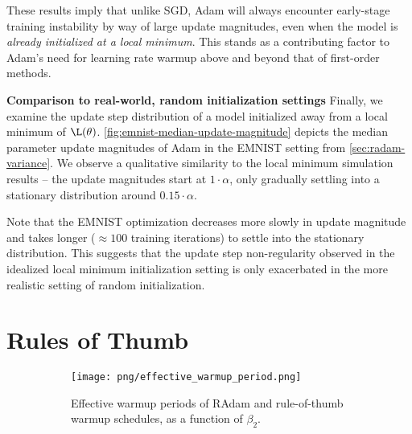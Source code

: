 {These results imply that unlike SGD, Adam will always encounter early-stage training instability by way of large update magnitudes, even when the model is \emph{already initialized at a local minimum}. This stands as a contributing factor to Adam's need for learning rate warmup above and beyond that of first-order methods.

\textbf{Comparison to real-world, random initialization settings}
\quad
Finally, we examine the update step distribution of a model initialized away from a local minimum of $\L(\theta)$. \cref*{fig:emnist-median-update-magnitude} depicts the median parameter update magnitudes of Adam in the EMNIST setting from \cref*{sec:radam-variance}. We observe a qualitative similarity to the local minimum simulation results -- the update magnitudes start at $1 \cdot \alpha$, only gradually settling into a stationary distribution around $0.15 \cdot \alpha$.

Note that the EMNIST optimization decreases more slowly in update magnitude and takes longer ($\approx 100$ training iterations) to settle into the stationary distribution. This suggests that the update step non-regularity observed in the idealized local minimum initialization setting is only exacerbated in the more realistic setting of random initialization.\section{Rules of Thumb}
\label{sec:ruleofthumb}

\begin{figure*}[ht]
\centering

\captionsetup{
  justification=centering,
  margin=0.1in,
  size=normalsize
}

\begin{subfigure}[t]{.49\linewidth}
  \centering

  \captionsetup{
    justification=centering,
    margin=0.1in
  }

  \texttt{[image: png/effective\_warmup\_period.png]}
  
  \caption{Effective warmup periods of RAdam and rule-of-thumb warmup schedules, as a function of $\beta_2$.}
  
  \label{fig:effective-warmup-period}
\end{subfigure}
\begin{subfigure}[t]{.49\linewidth}
  \centering

  \captionsetup{
    justification=centering,
    margin=0.1in
  }


\end{subfigure}
\end{figure*}}

